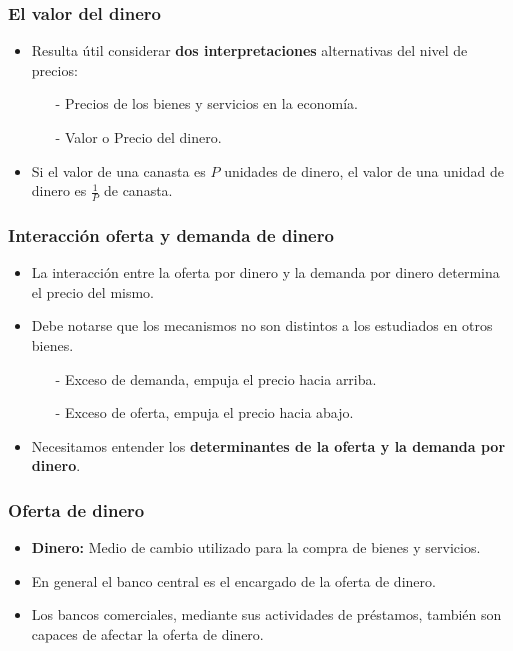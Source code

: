 \documentclass{beamer}
\begin{document}
\begin{frame}
\frametitle{El valor del dinero}
\begin{itemize}
\setlength\itemsep{1.4em}
\item Resulta \'util considerar \textbf{dos interpretaciones} alternativas del nivel de precios:\\
\begin{itemize}
\setlength\itemsep{0.7em}
\item[-] Precios de los bienes y servicios en la econom\'ia.
\item[-] Valor o Precio del dinero.
\end{itemize}
\item Si el valor de una canasta es $P$ unidades de dinero, el valor de una unidad de dinero es $\frac{1}{P}$ de canasta.
\end{itemize}
\end{frame}

\begin{frame}
\frametitle{Interacci\'on oferta y demanda de dinero}
\begin{itemize}
\setlength\itemsep{1.4em}
\item La interacci\'on entre la oferta por dinero y la demanda por dinero determina el precio del mismo.
\item Debe notarse que los mecanismos no son distintos a los estudiados en otros bienes.\\
\begin{itemize}
\setlength\itemsep{0.8em}
\item[-] Exceso de demanda, empuja el precio hacia arriba.
\item[-] Exceso de oferta, empuja el precio hacia abajo.
\end{itemize}
\item Necesitamos entender los \textbf{determinantes de la oferta y la demanda por dinero}.
\end{itemize}
\end{frame}

\begin{frame}
\frametitle{Oferta de dinero}
\begin{itemize}
\setlength\itemsep{1.4em}
\item \textbf{Dinero:} Medio de cambio utilizado para la compra de bienes y servicios.
\item En general el banco central es el encargado de la oferta de dinero.
\item Los bancos comerciales, mediante sus actividades de pr\'estamos, tambi\'en son capaces de afectar la oferta de dinero.
\end{itemize}
\end{frame}
\end{document}
